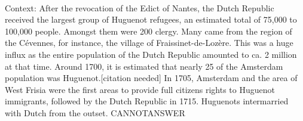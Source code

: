 \documentclass[11pt,a4paper, onecolumn]{article}
\begin{document}
\\ Context: After the revocation of the Edict of Nantes, the Dutch Republic received the largest group of Huguenot refugees, an estimated total of 75,000 to 100,000 people. Amongst them were 200 clergy. Many came from the region of the Cévennes, for instance, the village of Fraissinet-de-Lozère. This was a huge influx as the entire population of the Dutch Republic amounted to ca. 2 million at that time. Around 1700, it is estimated that nearly 25  of the Amsterdam population was Huguenot.[citation needed] In 1705, Amsterdam and the area of West Frisia were the first areas to provide full citizens rights to Huguenot immigrants, followed by the Dutch Republic in 1715. Huguenots intermarried with Dutch from the outset. CANNOTANSWER
\end{document}
